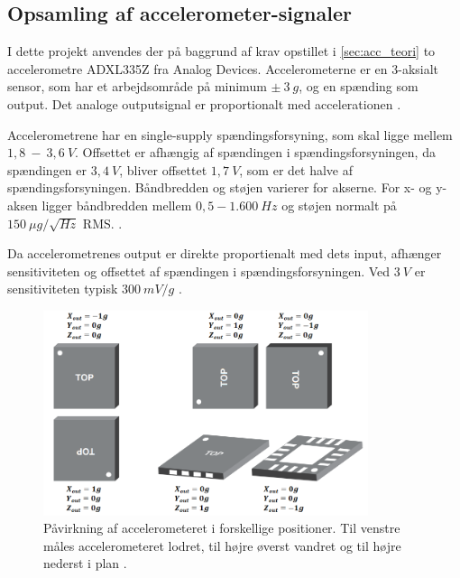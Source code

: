 \subsection{Opsamling af accelerometer-signaler}\label{sec:acc_krav}

I dette projekt anvendes der på baggrund af krav opstillet i \autoref{sec:acc_teori} to accelerometre ADXL335Z fra Analog Devices. Accelerometerne er en 3-aksialt sensor, som har et arbejdsområde på minimum $\pm~3~g$, og en spænding som output. Det analoge outputsignal er proportionalt med accelerationen \citep{analogdevices2009}. 

Accelerometrene har en single-supply spændingsforsyning, som skal ligge mellem $1,8~-~3,6~V$.  Offsettet er afhængig af spændingen i spændingsforsyningen, da spændingen er $3,4~V$, bliver offsettet $1,7~V$, som er det halve af spændingsforsyningen. Båndbredden og støjen varierer for akserne. For x- og y-aksen ligger båndbredden mellem $0,5 - 1.600~Hz$ og støjen normalt på $150~\mu g/\sqrt{Hz}$ RMS.  \citep{analogdevices2010}. %

Da accelerometrenes output er direkte proportienalt med dets input, afhænger sensitiviteten og offsettet af spændingen i spændingsforsyningen. Ved $3~V$ er sensitiviteten typisk $300~mV/g$ \citep{analogdevices2010}. 


\begin{figure}[H]
\centering
\includegraphics[width=0.85\textwidth]{figures/acc_paavirkning}
\caption{Påvirkning af accelerometeret i forskellige positioner. Til venstre måles accelerometeret lodret, til højre øverst vandret og til højre nederst i plan \citep{analogdevices2010}.}
\label{fig:acc}
\end{figure}

